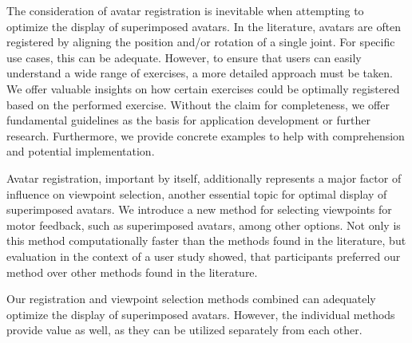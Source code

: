 The consideration of avatar registration is inevitable when attempting to optimize the display of superimposed avatars. In the literature, avatars are often registered by aligning the position and/or rotation of a single joint. For specific use cases, this can be adequate. However, to ensure that users can easily understand a wide range of exercises, a more detailed approach must be taken. We offer valuable insights on how certain exercises could be optimally registered based on the performed exercise. Without the claim for completeness, we offer fundamental guidelines as the basis for application development or further research. Furthermore, we provide concrete examples to help with comprehension and potential implementation.

Avatar registration, important by itself, additionally represents a major factor of influence on viewpoint selection, another essential topic for optimal display of superimposed avatars. We introduce a new method for selecting viewpoints for motor feedback, such as superimposed avatars, among other options. Not only is this method computationally faster than the methods found in the literature, but evaluation in the context of a user study showed, that participants preferred our method over other methods found in the literature.

Our registration and viewpoint selection methods combined can adequately optimize the display of superimposed avatars. However, the individual methods provide value as well, as they can be utilized separately from each other.